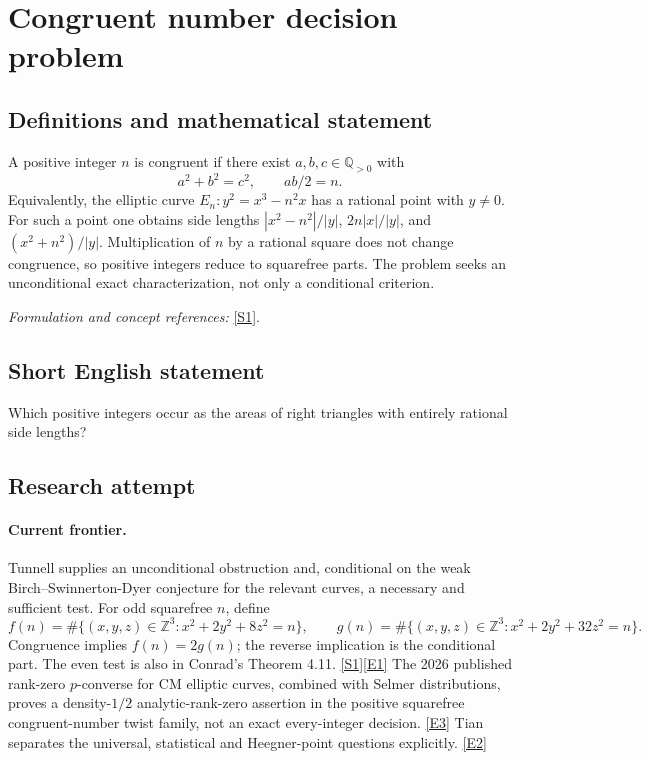 \documentclass[11pt,a4paper]{article}
\newcommand{\Z}{\mathbb{Z}}
\newcommand{\Q}{\mathbb{Q}}
\newcommand{\sref}[2]{\hyperlink{source:#1:#2}{[S#2]}}
\newcommand{\eref}[2]{\hyperlink{extra:#1:#2}{[E#2]}}
\newif\ifshowcatalogue
\newcommand{\cataloguescope}[1]{\ifshowcatalogue
 \paragraph{Exact scope in the supplied catalogue.}
 \begin{quote}\small #1\end{quote}\fi}
\numberwithin{equation}{section}
\begin{document}
\setcounter{section}{0}
\clearpage
\section*{\texorpdfstring{Congruent number decision problem}{Congruent number decision problem}}\label{8900008}
\subsection{Definitions and mathematical statement}
A positive integer $n$ is congruent if there exist $a,b,c\in\Q_{>0}$ with
\[
 a^2+b^2=c^2,\qquad ab/2=n.
\]
Equivalently, the elliptic curve $E_n:y^2=x^3-n^2x$ has a rational point with $y\ne0$. For such a point one obtains side lengths $|x^2-n^2|/|y|$, $2n|x|/|y|$, and $(x^2+n^2)/|y|$. Multiplication of $n$ by a rational square does not change congruence, so positive integers reduce to squarefree parts. The problem seeks an unconditional exact characterization, not only a conditional criterion.
\par\smallskip\textit{Formulation and concept references:} \sref{8900008}{1}.
\cataloguescope{Determine exactly which positive integers are congruent numbers, i.e. areas of right triangles with all three sides rational, equivalently for which squarefree n the elliptic curve y\textasciicircum{}2 = x\textasciicircum{}3 - n\textasciicircum{}2 x has a rational point with y != 0.}
\subsection{Short English statement}
Which positive integers occur as the areas of right triangles with entirely rational side lengths?
\subsection{Research attempt}

\paragraph{Current frontier.}
Tunnell supplies an unconditional obstruction and, conditional on the weak
Birch--Swinnerton-Dyer conjecture for the relevant curves, a necessary and
sufficient test. For odd squarefree $n$, define
\[
 f(n)=\#\{(x,y,z)\in\Z^3:x^2+2y^2+8z^2=n\},\qquad
 g(n)=\#\{(x,y,z)\in\Z^3:x^2+2y^2+32z^2=n\}.
\]
Congruence implies $f(n)=2g(n)$; the reverse implication is the conditional
part. The even test is also in Conrad's Theorem 4.11. \sref{8900008}{1}\eref{8900008}{1}
The 2026 published rank-zero $p$-converse for CM elliptic curves, combined
with Selmer distributions, proves a density-$1/2$ analytic-rank-zero assertion
in the positive squarefree congruent-number twist family, not an exact
every-integer decision. \eref{8900008}{3} Tian separates the universal,
statistical and Heegner-point questions explicitly. \eref{8900008}{2}
\end{document}

